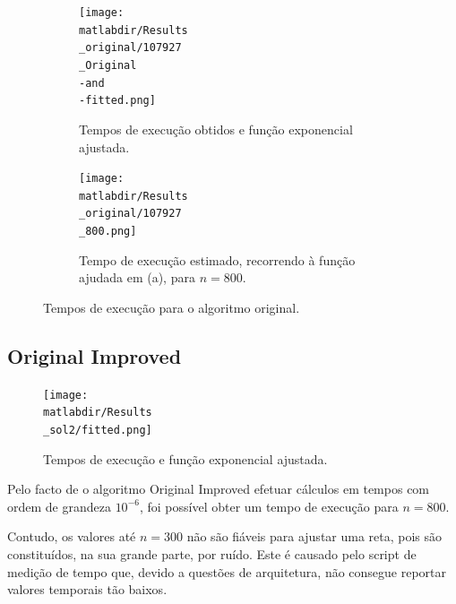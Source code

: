\documentclass[portuguese,11pt,a4paper,titlepage]{article}
\newcommand{\matlabdir}{"../MATLAB fittings"}
\begin{document}
\begin{figure}[h]
	\begin{subfigure}{0.47\textwidth}
	\texttt{[image: \\matlabdir/Results\\\_original/107927\\\_Original\\-and\\-fitted.png]} 
	\caption{Tempos de execução obtidos e função exponencial ajustada.}
	\label{fig:subim1}
	\end{subfigure}
	\hspace{0.049\textwidth}
	\begin{subfigure}{0.47\textwidth}
	\texttt{[image: \\matlabdir/Results\\\_original/107927\\\_800.png]}
	\caption{Tempo de execução estimado, recorrendo à função ajudada em (a), para \begin{math}n=800\end{math}.}
	\label{fig:original_800}
	\end{subfigure}
	
	\caption{Tempos de execução para o algoritmo original.}
	\vspace{-20pt}
	\label{fig:original}
\end{figure}

\subsection{Original Improved}
\begin{figure}
	\vspace{-13pt}
	\texttt{[image: \\matlabdir/Results\\\_sol2/fitted.png]}
	\caption{Tempos de execução e função exponencial ajustada.}
	\label{fig:sol2}
\end{figure}
	
Pelo facto de o algoritmo Original Improved efetuar cálculos em tempos com ordem de grandeza
\begin{math}10^{-6}\end{math}, foi possível obter um tempo de execução para \begin{math}n = 800\end{math}.

Contudo, os valores até \begin{math}n = 300\end{math} não são fiáveis para ajustar uma reta,
pois são constituídos, na sua grande parte, por ruído.
Este é causado pelo script de medição de tempo que, devido a questões de arquitetura,
não consegue reportar valores temporais tão baixos.
\pagebreak
\end{document}
